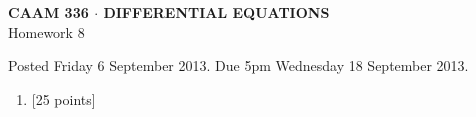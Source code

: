 \documentclass[10pt]{article}
\begin{document}
\vspace*{-5em}
\begin{center}
\large \textsf{\textbf{CAAM 336 $\cdot$ DIFFERENTIAL EQUATIONS}\\[0.5em]
Homework 8 }
\end{center}

Posted Friday 6 September 2013.  Due 5pm Wednesday 18 September 2013.

\begin{enumerate}\addtocounter{enumi}{7}
\item {[25 points]}\\  

\end{enumerate}
\end{document}
